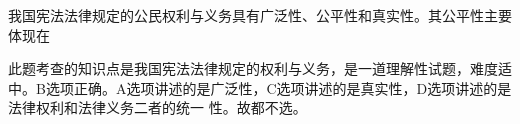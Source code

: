 \question 我国宪法法律规定的公民权利与义务具有广泛性、公平性和真实性。其公平性主要体现在
\par{}
\begin{solution}此题考查的知识点是我国宪法法律规定的权利与义务，是一道理解性试题，难度适中。B选项正确。A选项讲述的是广泛性，C选项讲述的是真实性，D选项讲述的是法律权利和法律义务二者的统一
性。故都不选。
\end{solution}

